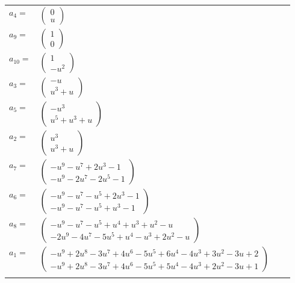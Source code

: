 \documentclass[1p]{elsarticle_modified}
\theoremstyle{definition}
\begin{document}
\begin{tabular}{m{7pt} m{180pt} m{7pt} m{180pt} }
\flushright $a_{4}=$&$\begin{pmatrix}0\\u\end{pmatrix}$ \\
\flushright $a_{9}=$&$\begin{pmatrix}1\\0\end{pmatrix}$ \\
\flushright $a_{10}=$&$\begin{pmatrix}1\\- u^2\end{pmatrix}$ \\
\flushright $a_{3}=$&$\begin{pmatrix}- u\\u^3+u\end{pmatrix}$ \\
\flushright $a_{5}=$&$\begin{pmatrix}- u^3\\u^5+u^3+u\end{pmatrix}$ \\
\flushright $a_{2}=$&$\begin{pmatrix}u^3\\u^3+u\end{pmatrix}$ \\
\flushright $a_{7}=$&$\begin{pmatrix}- u^9- u^7+2 u^3-1\\- u^9-2 u^7-2 u^5-1\end{pmatrix}$ \\
\flushright $a_{6}=$&$\begin{pmatrix}- u^9- u^7- u^5+2 u^3-1\\- u^9- u^7- u^5+u^3-1\end{pmatrix}$ \\
\flushright $a_{8}=$&$\begin{pmatrix}- u^9- u^7- u^5+u^4+u^3+u^2- u\\-2 u^9-4 u^7-5 u^5+u^4- u^3+2 u^2- u\end{pmatrix}$ \\
\flushright $a_{1}=$&$\begin{pmatrix}- u^9+2 u^8-3 u^7+4 u^6-5 u^5+6 u^4-4 u^3+3 u^2-3 u+2\\- u^9+2 u^8-3 u^7+4 u^6-5 u^5+5 u^4-4 u^3+2 u^2-3 u+1\end{pmatrix}$\\&\end{tabular}
\end{document}
